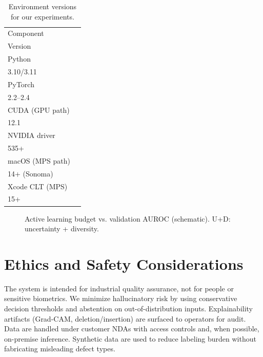 \documentclass[conference]{IEEEtran}
\begin{document}
\begin{table}[!t]
  \centering
  \caption{Environment versions for our experiments.}
  \label{tab:env_versions}
  \vspace{2pt}
  \begin{tabular}{@{}ll@{}}
    \toprule
    Component \\ Version \\
    \midrule
    Python \\ 3.10/3.11 \\
    PyTorch \\ 2.2--2.4 \\
    CUDA (GPU path) \\ 12.1 \\
    NVIDIA driver \\ 535+ \\
    macOS (MPS path) \\ 14+ (Sonoma) \\
    Xcode CLT (MPS) \\ 15+ \\
    \bottomrule
  \end{tabular}
\end{table}

\begin{figure}[!t]
  \centering
  \caption{Active learning budget vs. validation AUROC (schematic). U+D: uncertainty + diversity.}
  \label{fig:al_budget}
\end{figure}

\section{Ethics and Safety Considerations}
The system is intended for industrial quality assurance, not for people or sensitive biometrics. We minimize hallucinatory risk by using conservative decision thresholds and abstention on out-of-distribution inputs. Explainability artifacts (Grad-CAM, deletion/insertion) are surfaced to operators for audit. Data are handled under customer NDAs with access controls and, when possible, on-premise inference. Synthetic data are used to reduce labeling burden without fabricating misleading defect types.
\end{document}
